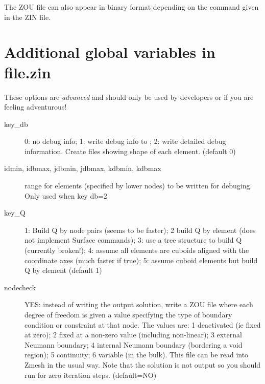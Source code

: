 \documentclass[a4paper,twoside,11pt]{book}
\begin{document}
The ZOU file can also appear in binary format depending on the
 command given in the ZIN file.

\chapter{Additional global variables in file.zin}
\label{additional}

These options are \emph{advanced} and should only be used by
developers or if you are feeling adventurous!

\begin{description}
\item[key\_db] 0: no debug info; 1: write debug info to ; 2:
  write detailed debug information. Create files showing shape of each
  element. (default 0)

\item[idmin, idbmax, jdbmin, jdbmax, kdbmin, kdbmax] range for
  elements (specified by lower nodes) to be written for debuging. Only
  used when key db=2

\item[key\_Q] 1: Build Q by node pairs (seems to be faster); 2 build Q
  by element (does not implement Surface commands); 3: use a tree
  structure to build Q (currently broken!); 4: assume all elements are
  cuboids aligned with the coordinate axes (much faster if true); 5:
  assume cuboid elements but build Q by element (default 1)

\item[nodecheck] YES: instead of writing the output solution, write a
  ZOU file where each degree of freedom is given a value specifying
  the type of boundary condition or constraint at that node. The
  values are: 1 deactivated (ie fixed at zero); 2 fixed at a non-zero
  value (including non-linear); 3 external Neumann boundary; 4
  internal Neumann boundary (bordering a void region); 5 continuity; 6
  variable (in the bulk). This file can be read into Zmesh in the
  usual way. Note that the solution is not output so you should run
  for zero iteration steps. (default=NO)
\end{description}
\end{document}
